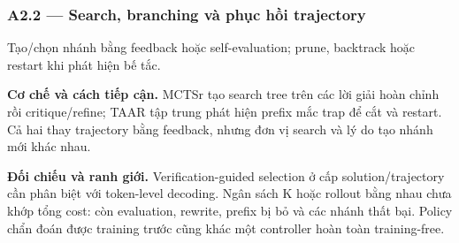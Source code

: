 \subsubsection*{A2.2 — Search, branching và phục hồi trajectory}
Tạo/chọn nhánh bằng feedback hoặc self-evaluation; prune, backtrack hoặc restart khi phát hiện bế tắc.

\noindent\textbf{Cơ chế và cách tiếp cận.} MCTSr tạo search tree trên các lời giải hoàn chỉnh rồi critique/refine; TAAR tập trung phát hiện prefix mắc trap để cắt và restart. Cả hai thay trajectory bằng feedback, nhưng đơn vị search và lý do tạo nhánh mới khác nhau.\par
\noindent\textbf{Đối chiếu và ranh giới.} Verification-guided selection ở cấp solution/trajectory cần phân biệt với token-level decoding. Ngân sách K hoặc rollout bằng nhau chưa khớp tổng cost: còn evaluation, rewrite, prefix bị bỏ và các nhánh thất bại. Policy chẩn đoán được training trước cũng khác một controller hoàn toàn training-free.\par

